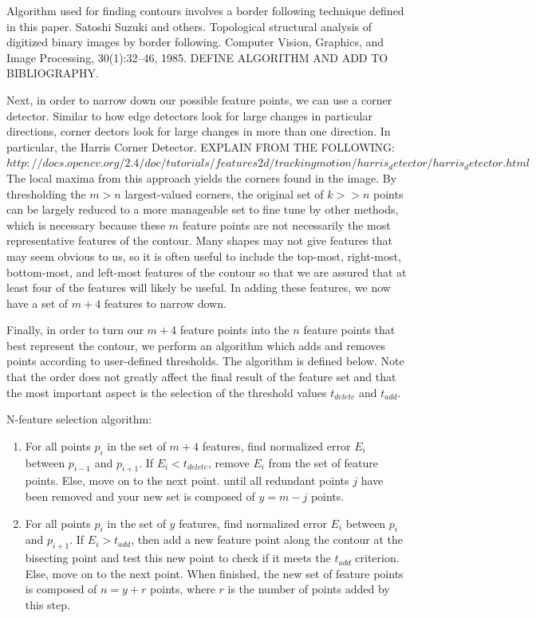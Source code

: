 \documentclass[paper=a4, fontsize=11pt]{scrartcl} %
\begin{document}
Algorithm used for finding contours involves a border following technique defined in this paper. 
Satoshi Suzuki and others. Topological structural analysis of digitized binary images by border following. Computer Vision, Graphics, and Image Processing, 30(1):32–46, 1985. DEFINE ALGORITHM AND ADD TO BIBLIOGRAPHY. 

Next, in order to narrow down our possible feature points, we can use a corner detector. Similar to how edge detectors look for large changes in particular directions, corner dectors look for large changes in more than one direction. In particular, the Harris Corner Detector. EXPLAIN FROM THE FOLLOWING: $http://docs.opencv.org/2.4/doc/tutorials/features2d/trackingmotion/harris_detector/harris_detector.html$ The local maxima from this approach yields the corners found in the image. By thresholding the $m > n$ largest-valued corners, the original set of $k >> n$ points can be largely reduced to a more manageable set to fine tune by other methods, which is necessary because these $m$ feature points are not necessarily the most representative features of the contour. Many shapes may not give features that may seem obvious to us, so it is often useful to include the top-most, right-most, bottom-most, and left-most features of the contour so that we are assured that at least four of the features will likely be useful. In adding these features, we now have a set of $m+4$ features to narrow down. 

Finally, in order to turn our $m+4$ feature points into the $n$ feature points that best represent the contour, we perform an algorithm which adds and removes points according to user-defined thresholds. The algorithm is defined below. Note that the order does not greatly affect the final result of the feature set and that the most important aspect is the selection of the threshold values $t_{delete}$ and $t_{add}$. 

N-feature selection algorithm: 
\begin{enumerate}
	\item 
	For all points $p_i$ in the set of $m+4$ features, find normalized error $E_i$ between $p_{i-1}$ and $p_{i+1}$. If $E_i < t_{delete}$, remove $E_i$ from the set of feature points. Else, move on to the next point. until all redundant points $j$ have been removed and your new set is composed of $y = m - j$ points.  
	\item
	For all points $p_i$ in the set of $y$ features, find normalized error $E_i$ between $p_{i}$ and $p_{i+1}$. If $E_i > t_{add}$, then add a new feature point along the contour at the bisecting point and test this new point to check if it meets the $t_{add}$ criterion. Else, move on to the next point. When finished, the new set of feature points is composed of $n = y + r$ points, where $r$ is the number of points added by this step. 
\end{enumerate}
\end{document}
